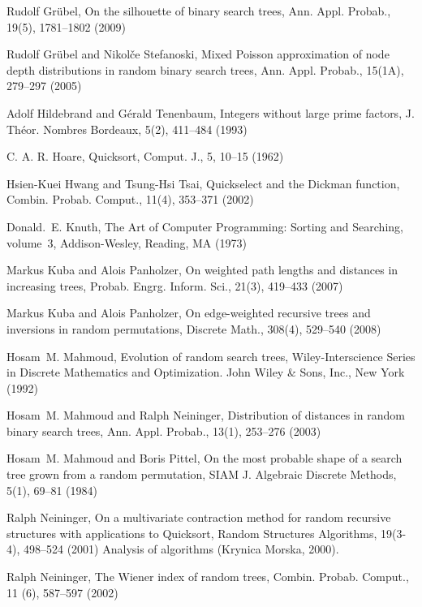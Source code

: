 \documentclass{amsart}       %
\begin{document}
\begin{thebibliography}{}
Rudolf Gr{\"u}bel, On the silhouette of binary search trees,
Ann. Appl. Probab., 19(5), 1781--1802 (2009)

Rudolf Gr{\"u}bel and Nikol{\v{c}}e Stefanoski,
 Mixed {P}oisson approximation of node depth distributions in random
  binary search trees,
Ann. Appl. Probab., 15(1A), 279--297 (2005)


Adolf Hildebrand and G\'erald Tenenbaum, Integers without large prime factors, 
 J. Th\'eor. Nombres Bordeaux, 5(2), 411--484 (1993)
  

  C. A. R. Hoare,
   Quicksort, Comput. J., 5, 10--15 (1962) 

Hsien-Kuei Hwang and Tsung-Hsi Tsai,
 Quickselect and the Dickman function, Combin. Probab. Comput., 11(4), 353--371 (2002)  
  

Donald.~E. Knuth, The Art of Computer Programming: Sorting and Searching,
  volume~3,
 Addison-Wesley, Reading, MA (1973)

Markus Kuba and Alois Panholzer,
 On weighted path lengths and distances in increasing trees,
Probab. Engrg. Inform. Sci., 21(3),
  419--433 (2007)

Markus Kuba and Alois Panholzer,
 On edge-weighted recursive trees and inversions in random
  permutations,
Discrete Math., 308(4), 529--540 (2008)

Hosam~M. Mahmoud,
Evolution of random search trees,
 Wiley-Interscience Series in Discrete Mathematics and Optimization.
  John Wiley \& Sons, Inc., New York (1992)

Hosam~M. Mahmoud and Ralph Neininger,
 Distribution of distances in random binary search trees,
 Ann. Appl. Probab., 13(1), 253--276 (2003)

Hosam~M. Mahmoud and Boris Pittel,
 On the most probable shape of a search tree grown from a random
  permutation,
SIAM J. Algebraic Discrete Methods, 5(1),
  69--81 (1984)

Ralph Neininger,
 On a multivariate contraction method for random recursive structures
  with applications to {Q}uicksort,
 Random Structures Algorithms, 19(3-4),
  498--524 (2001)
 Analysis of algorithms (Krynica Morska, 2000).

Ralph Neininger,
 The {W}iener index of random trees,
Combin. Probab. Comput., 11 (6), 587--597
  (2002)


\end{thebibliography}
\end{document}
